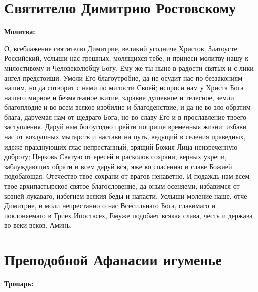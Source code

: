 
 

\section{Святителю Димитрию Ростовскому}
 

\bfseries Молитва:\normalfont{}\nopagebreak


О, всеблаженне святителю Димитрие, великий угодниче Христов, Златоусте Российский, услыши нас грешных, молящихся тебе, и принеси молитву нашу к милостивому и Человеколюбцу Богу, Ему же ты ныне в радости святых и с лики ангел предстоиши. Умоли Его благоутробие, да не осудит нас по беззакониям нашим, но да сотворит с нами по милости Своей; испроси нам у Христа Бога нашего мирное и безмятежное житие, здравие душевное и телесное, земли благоплодие и во всем всякое изобилие и благоденствие, и да не во зло обратим блага, даруемая нам от щедраго Бога, но во славу Его и в прославление твоего заступления. Даруй нам богоугодно прейти поприще временныя жизни: избави нас от воздушных мытарств и настави на путь, ведущий в селения праведных, идеже празднующих глас непрестанный, зрящий Божия Лица неизреченную доброту; Церковь Святую от ересей и расколов сохрани, верных укрепи, заблуждающих обрати и всем даруй вся, яже ко спасению и славе Божией подобающая, Отечество твое сохрани от врагов ненаветно. И подаждь нам всем твое архипастырское святое благословение, да оным осеняеми, избавимся от козней лукаваго, избегнем всякия беды и напасти. Услыши моление наше, отче Димитрие, и моли непрестанно о нас Всесильнаго Бога, славимаго и поклоняемаго в Триех Ипостасех, Емуже подобает всякая слава, честь и держава во веки веков. Аминь.
\mychapterending


 

\section{Преподобной Афанасии игуменье}
 


\bfseries Тропарь:\normalfont{}\nopagebreak

